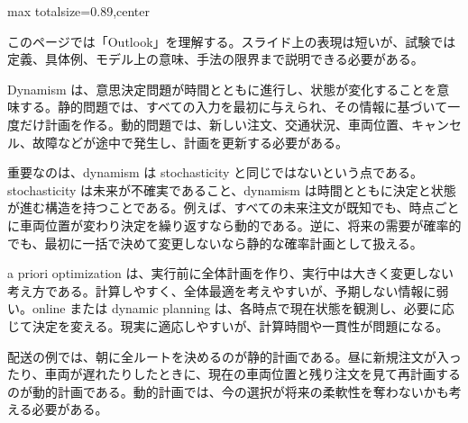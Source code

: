 \begin{minipage}[t]{0.58\textwidth}
\begin{adjustbox}{max totalsize={\textwidth}{0.89\textheight},center}
\begin{minipage}{\textwidth}\scriptsize
{}このページでは「Outlook」を理解する。スライド上の表現は短いが、試験では定義、具体例、モデル上の意味、手法の限界まで説明できる必要がある。\par
Dynamism は、意思決定問題が時間とともに進行し、状態が変化することを意味する。静的問題では、すべての入力を最初に与えられ、その情報に基づいて一度だけ計画を作る。動的問題では、新しい注文、交通状況、車両位置、キャンセル、故障などが途中で発生し、計画を更新する必要がある。\par
重要なのは、dynamism は stochasticity と同じではないという点である。stochasticity は未来が不確実であること、dynamism は時間とともに決定と状態が進む構造を持つことである。例えば、すべての未来注文が既知でも、時点ごとに車両位置が変わり決定を繰り返すなら動的である。逆に、将来の需要が確率的でも、最初に一括で決めて変更しないなら静的な確率計画として扱える。\par
a priori optimization は、実行前に全体計画を作り、実行中は大きく変更しない考え方である。計算しやすく、全体最適を考えやすいが、予期しない情報に弱い。online または dynamic planning は、各時点で現在状態を観測し、必要に応じて決定を変える。現実に適応しやすいが、計算時間や一貫性が問題になる。\par
配送の例では、朝に全ルートを決めるのが静的計画である。昼に新規注文が入ったり、車両が遅れたりしたときに、現在の車両位置と残り注文を見て再計画するのが動的計画である。動的計画では、今の選択が将来の柔軟性を奪わないかも考える必要がある。\par

\end{minipage}
\end{adjustbox}
\end{minipage}
